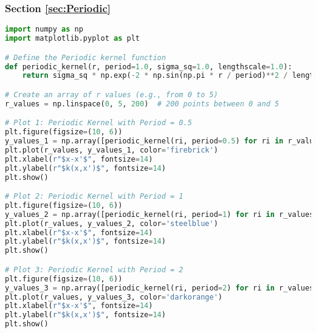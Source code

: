 \documentclass[12pt,a4paper]{article}
\begin{document}
\subsubsection{Section \ref{sec:Periodic}}

\vspace{10pt}
\begin{lstlisting}[language=python, caption={Code of the Creation of Figures \ref{fig:Per_PriorDist 0.5 plot},\ref{fig:Per_PriorDist 1 plot} and \ref{fig:Per_PriorDist 2 plot}}]
import numpy as np
import matplotlib.pyplot as plt

# Define the Periodic kernel function
def periodic_kernel(r, period=1.0, sigma_sq=1.0, lengthscale=1.0):
    return sigma_sq * np.exp(-2 * np.sin(np.pi * r / period)**2 / lengthscale**2)

# Create an array of r values (e.g., from 0 to 5)
r_values = np.linspace(0, 5, 200)  # 200 points between 0 and 5

# Plot 1: Periodic Kernel with Period = 0.5
plt.figure(figsize=(10, 6))
y_values_1 = np.array([periodic_kernel(ri, period=0.5) for ri in r_values])
plt.plot(r_values, y_values_1, color='firebrick')
plt.xlabel(r"$x-x'$", fontsize=14)
plt.ylabel(r"$k(x,x')$", fontsize=14)
plt.show()

# Plot 2: Periodic Kernel with Period = 1
plt.figure(figsize=(10, 6))
y_values_2 = np.array([periodic_kernel(ri, period=1) for ri in r_values])
plt.plot(r_values, y_values_2, color='steelblue')
plt.xlabel(r"$x-x'$", fontsize=14)
plt.ylabel(r"$k(x,x')$", fontsize=14)
plt.show()

# Plot 3: Periodic Kernel with Period = 2
plt.figure(figsize=(10, 6))
y_values_3 = np.array([periodic_kernel(ri, period=2) for ri in r_values])
plt.plot(r_values, y_values_3, color='darkorange')
plt.xlabel(r"$x-x'$", fontsize=14)
plt.ylabel(r"$k(x,x')$", fontsize=14)
plt.show()
\end{lstlisting}
\end{document}
